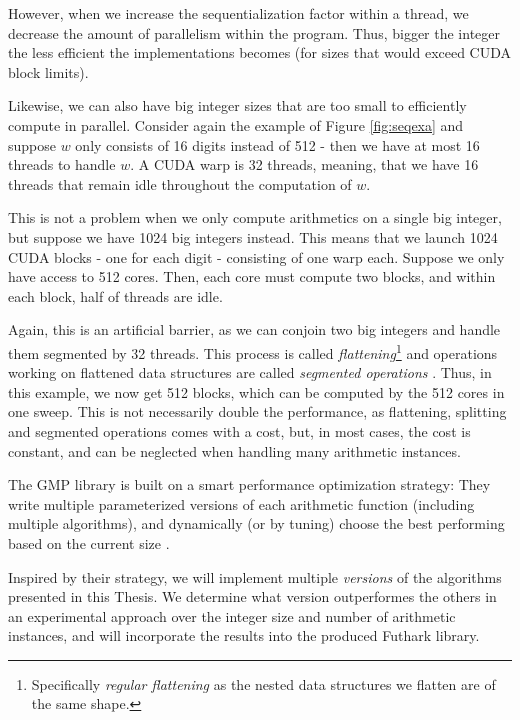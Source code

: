 However, when we increase the sequentialization factor within a thread, we
decrease the amount of parallelism within the program. Thus, bigger the integer the
less efficient the implementations becomes (for sizes that would exceed CUDA
block limits).

Likewise, we can also have big integer sizes that are too small to efficiently
compute in parallel. Consider again the example of Figure \ref{fig:seqexa} and
suppose $w$ only consists of 16 digits instead of 512 - then we have at most 16
threads to handle $w$. A CUDA warp is 32 threads, meaning, that we have 16
threads that remain idle throughout the computation of $w$.

This is not a problem when we only compute arithmetics on a single big integer,
but suppose we have 1024 big integers instead. This means that we launch 1024
CUDA blocks - one for each digit - consisting of one warp each. Suppose we only
have access to 512 cores. Then, each core must compute two blocks, and within
each block, half of threads are idle.

Again, this is an artificial barrier, as we can conjoin two big integers and
handle them segmented by 32 threads. This process is called
\textit{flattening}\footnote{Specifically \textit{regular flattening} as the
  nested data structures we flatten are of the same shape.} and operations
working on flattened data structures are called \textit{segmented operations}
\cite{Henriksen:2017:FPF:3062341.3062354}. Thus, in this example, we now get 512
blocks, which can be computed by the 512 cores in one sweep. This is not
necessarily double the performance, as flattening, splitting and segmented
operations comes with a cost, but, in most cases, the cost is constant, and can
be neglected when handling many arithmetic instances.

The GMP library is built on a smart performance optimization strategy: They
write multiple parameterized versions of each arithmetic function (including
multiple algorithms), and dynamically (or by tuning) choose the best performing
based on the current size \cite{GMP}.

Inspired by their strategy, we will implement multiple \textit{versions} of the
algorithms presented in this Thesis. We determine what version outperformes the
others in an experimental approach over the integer size and number of
arithmetic instances, and will incorporate the results into the produced
Futhark library.


